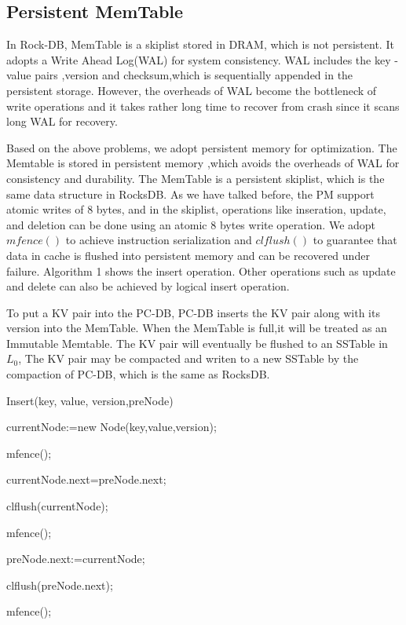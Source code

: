 \subsection{Persistent MemTable}
In Rock-DB, MemTable is a skiplist stored in DRAM, which is not persistent. 
It adopts a Write Ahead Log(WAL) for system consistency.
WAL includes the key -value pairs ,version and checksum,which is sequentially appended in the persistent storage. 
However, the overheads of WAL become the bottleneck of write operations and it takes rather long time to recover from crash since it scans long WAL for recovery.

Based on the above problems, we adopt persistent memory for optimization. 
The Memtable is stored in persistent memory ,which avoids the overheads of WAL for consistency and durability. 
The MemTable is a persistent skiplist, which is the same data structure in  RocksDB. As we have talked before, the PM support atomic writes of 8 bytes, and in the skiplist, operations like inseration, update, and deletion can be done using an atomic 8 bytes write operation.
We adopt  $mfence()$ to achieve instruction serialization and $clflush()$ to guarantee that data in cache is flushed into persistent memory and can be recovered under failure. 
Algorithm 1 shows the insert operation. Other operations such as update and delete can also be achieved by logical insert operation.

To put a KV pair into the PC-DB, PC-DB inserts the KV pair along with its version into the MemTable. When the MemTable is full,it will be treated as an Immutable Memtable. The KV pair will eventually be flushed to an SSTable in $L_0$, 
The KV pair may be compacted and writen to a new SSTable by the compaction of PC-DB, which is the same as RocksDB.


\begin{algorithm}[t]
\caption{Insert(key, value, version,preNode)} %


currentNode:=new Node(key,value,version);

mfence();

currentNode.next=preNode.next;

clflush(currentNode);

mfence();

preNode.next:=currentNode;

clflush(preNode.next);

mfence();

\end{algorithm}

